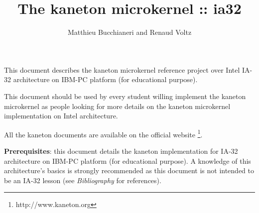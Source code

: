 %
%
%
%
%
%

%
%

\def\path{../../..}

%
%



%
%

\rhead{}

%
%

\title{The kaneton microkernel :: ia32
       \logos}

%
%

\author{\small{Matthieu Bucchianeri} and
        \small{Renaud Voltz}}

%
%



%
%

\maketitle

%
%

This document describes the kaneton microkernel reference project over
Intel IA-32 architecture on IBM-PC platform (for educational purpose).

\-

This document should be used by every student willing implement the
kaneton microkernel as people looking for more details on the kaneton
microkernel implementation on Intel architecture.

\-

All the kaneton documents are available on
the official website
  \footnote{http://www.kaneton.org}.

\-

\textbf{Prerequisites}: this document details the kaneton implementation
for IA-32 architecture on IBM-PC platform (for educational purpose). A
knowledge of this architecture's basics is strongly recommended as
this document is not intended to be an IA-32 lesson (see
\textit{Bibliography} for references).

%
%

\toc

%
%













